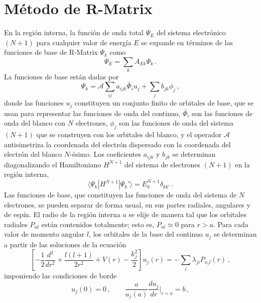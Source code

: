 \chapter{Método de R-Matrix}
\label{app:rmatrix}

En la región interna, la función de onda total $\Psi_E$ del sistema 
electrónico $(N+1)$ para cualquier valor de energía $E$ se expande en 
términos de las funciones de base de R-Matrix $\Psi_k$ como
\begin{equation}
\Psi_E=\sum_k A_{Ek}\Psi_k\,.
\label{eq:RM-wavefn}
\end{equation}
La funciones de base están dadas por
\begin{equation}
\Psi_k=\mathcal{A}\sum_{ij}a_{ijk}\bar{\Phi}_i u_j+\sum_j b_{jk}\phi_j\,,
\label{eq:RM-basisfn}
\end{equation}
donde las funciones $u_j$ constituyen un conjunto finito de orbitales de 
base, que se usan para representar las funciones de onda del continuo,
$\bar{\Phi}_i$ son las funciones de onda del blanco con $N$ electrones,
$\phi_j$ son las funciones de onda del sistema $(N+1)$ que se construyen 
con los orbitales del blanco, y el operador $\mathcal{A}$ antisimetriza 
la coordenada del electrón dispersado con la coordenada del electrón del 
blanco $N$-ésimo. Los coeficientes $a_{ijk}$ y $b_{jk}$ se determinan 
diagonalizando el Hamiltoniano $H^{N+1}$ del sistema de electrones 
$(N+1)$ en la región interna,
\begin{equation}
\langle\Psi_k\left|H^{N+1}\right|\Psi_k'\rangle=E_k^{N+1}\delta_{kk'}\,.
\label{eq:RM-N+1Hamilt}
\end{equation}
Las funciones de base, que constituyen las funciones de onda del sistema 
de $N$ electrones, se pueden separar de forma usual, en sus partes 
radiales, angulares y de espín.
El radio de la región interna $a$ se elije de manera tal que los 
orbitales radiales $P_{nl}$ están contenidos totalmente; esto es, 
$P_{nl}\simeq 0$ para $r>a$. Para cada valor de momento angular $l$, los 
orbitales de la base del continuo $u_j$ se determinan a partir de las 
soluciones de la ecuación
\begin{equation}
\left[-\frac{1}{2}\frac{d^2}{dr^2}+\frac{l(l+1)}{2r^2}+V(r)
-\frac{k_j^2}{2}\right]u_j(r)=-\sum_i\lambda_{ji}P_{n_il}(r)\,,
\label{eq:RM-difeq-uj}
\end{equation}
imponiendo las condiciones de borde 
\begin{equation}
u_j(0)=0\,,\qquad\frac{a}{u_j(a)}\frac{du_j}{dr}\bigg|_{r=a}=b\,,
\end{equation}
